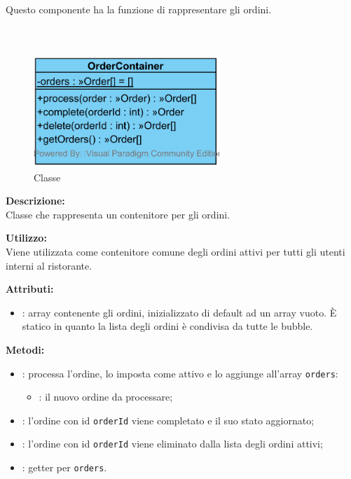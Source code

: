 Questo componente ha la funzione di rappresentare gli ordini.

\subparagraph[::OrderContainer]{\class}\mbox{}\\ \label{\class}
\begin{figure}[H]
	\centering
	\includegraphics[width=7cm]{./diagrammi/demo/server/order/ordercontainer.png}
	\caption{Classe \class}
\end{figure}
\textbf{Descrizione:}\\
Classe che rappresenta un contenitore per gli ordini.

\textbf{Utilizzo:}\\
Viene utilizzata come contenitore comune degli ordini attivi per tutti gli utenti interni al ristorante.

%

\textbf{Attributi:}
\begin{itemize}
	\item {}: array contenente gli ordini, inizializzato di default ad un array vuoto. È statico in quanto la lista degli ordini è condivisa da tutte le bubble.
\end{itemize}

\textbf{Metodi:}
\begin{itemize}
	\item {}: processa l'ordine, lo imposta come attivo e lo aggiunge all'array \texttt{orders}:
	\begin{itemize}
		\item {}: il nuovo ordine da processare;
	\end{itemize}
	\item {}: l'ordine con id \texttt{orderId} viene completato e il suo stato aggiornato;
	\item {}: l'ordine con id \texttt{orderId} viene eliminato dalla lista degli ordini attivi;
	\item {}: getter per \texttt{orders}.
\end{itemize}

